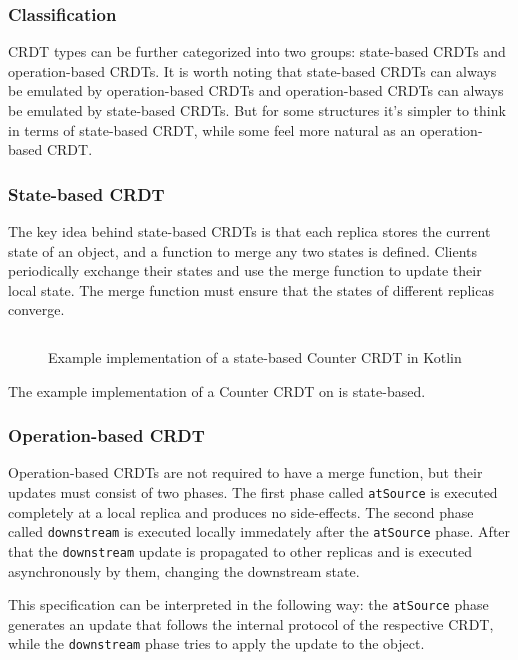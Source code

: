 \documentclass[a4paper, 11pt, oneside]{article}
\theoremstyle{definition}
\begin{document}
\subsubsection{Classification}

CRDT types can be further categorized into two groups:  state-based CRDTs and operation-based CRDTs. It is worth noting that state-based CRDTs can always be emulated by operation-based CRDTs and operation-based CRDTs can always be emulated by state-based CRDTs. But for some structures it's simpler to think in terms of state-based CRDT, while some feel more natural as an operation-based CRDT.

\subsubsection*{State-based CRDT}
The key idea behind state-based CRDTs is that each replica stores the current state of an object, and a function to merge any two states is defined. Clients periodically exchange their states and use the merge function to update their local state. The merge function must ensure that the states of different replicas converge.

\begin{figure}
    \inputminted[frame=single,linenos]{kotlin}{lst/state-counter.kt}
    \caption{Example implementation of a state-based Counter CRDT in Kotlin}
    \label{fig:state-counter}
\end{figure}

The example implementation of a Counter CRDT on  is state-based.

\subsubsection*{Operation-based CRDT}

Operation-based CRDTs are not required to have a merge function, but their updates must consist of two phases. The first phase called \verb|atSource| is executed completely at a local replica and produces no side-effects. The second phase called \verb|downstream| is executed locally immedately after the \verb|atSource| phase. After that the \verb|downstream| update is propagated to other replicas and is executed asynchronously by them, changing the downstream state.

This specification can be interpreted in the following way: the \verb|atSource| phase generates an update that follows the internal protocol of the respective CRDT, while the \verb|downstream| phase tries to apply the update to the object.
\end{document}
